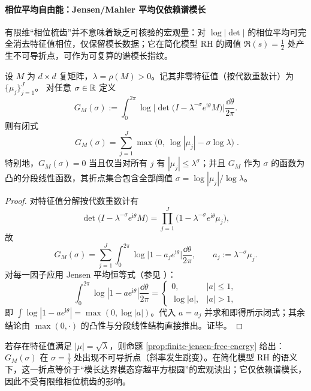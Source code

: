 \paragraph{相位平均自由能：Jensen/Mahler 平均仅依赖谱模长}
有限维“相位梳齿”并不意味着缺乏可核验的宏观量：对 \(\log|\det|\) 的相位平均可完全消去特征值相位，仅保留模长数据；它在简化模型 RH 的阈值 \(\Re(s)=\tfrac12\) 处产生不可导折点，可作为可复算的谱模长指纹。

\begin{proposition}\label{prop:finite-jensen-free-energy}
设 \(M\) 为 \(d\times d\) 复矩阵，\(\lambda=\rho(M)>0\)。记其非零特征值（按代数重数计）为 \(\{\mu_j\}_{j=1}^{J}\)。
对任意 \(\sigma\in\mathbb{R}\) 定义
$$
G_M(\sigma):=\int_0^{2\pi}\log\Big|\det\bigl(I-\lambda^{-\sigma}e^{\mathrm{i}\theta}M\bigr)\Big|\frac{\dd\theta}{2\pi}.
$$
则有闭式
$$
\boxed{\;
G_M(\sigma)=\sum_{j=1}^{J}\max\bigl(0,\ \log|\mu_j|-\sigma\log\lambda\bigr)\; }.
$$
特别地，\(G_M(\sigma)=0\) 当且仅当对所有 \(j\) 有 \(|\mu_j|\le \lambda^{\sigma}\)；并且 \(G_M\) 作为 \(\sigma\) 的函数为凸的分段线性函数，其折点集合包含全部阈值 \(\sigma=\log|\mu_j|/\log\lambda\)。
\end{proposition}

\begin{proof}
对特征值分解按代数重数计有
$$
\det\bigl(I-\lambda^{-\sigma}e^{\mathrm{i}\theta}M\bigr)
  =\prod_{j=1}^{J}\bigl(1-\lambda^{-\sigma}e^{\mathrm{i}\theta}\mu_j\bigr),
$$
故
$$
G_M(\sigma)=\sum_{j=1}^{J}\int_0^{2\pi}\log\bigl|1-a_j e^{\mathrm{i}\theta}\bigr|\frac{\dd\theta}{2\pi},
\qquad a_j:=\lambda^{-\sigma}\mu_j.
$$
对每一因子应用 Jensen 平均恒等式（参见 \cite{Duren1970TheoryHp}）：
$$
\int_0^{2\pi}\log|1-ae^{\mathrm{i}\theta}|\frac{\dd\theta}{2\pi}
  =
\begin{cases}
0,&|a|\le 1,\\
\log|a|,&|a|>1,
\end{cases}
$$
即 \(\int \log|1-ae^{\mathrm{i}\theta}|=\max(0,\log|a|)\)。代入 \(a=a_j\) 并求和即得所示闭式；其余结论由 \(\max(0,\cdot)\) 的凸性与分段线性结构直接推出。证毕。
\end{proof}

\begin{remark}\label{rem:finite-jensen-kink-half}
若存在特征值满足 \(|\mu|=\sqrt{\lambda}\)，则命题 \ref{prop:finite-jensen-free-energy} 给出：\(G_M(\sigma)\) 在 \(\sigma=\tfrac12\) 处出现不可导折点（斜率发生跳变）。在简化模型 RH 的语义下，这一折点等价于“模长达界模态穿越平方根圆”的宏观读出；它仅依赖谱模长，因此不受有限维相位梳齿的影响。
\end{remark}

